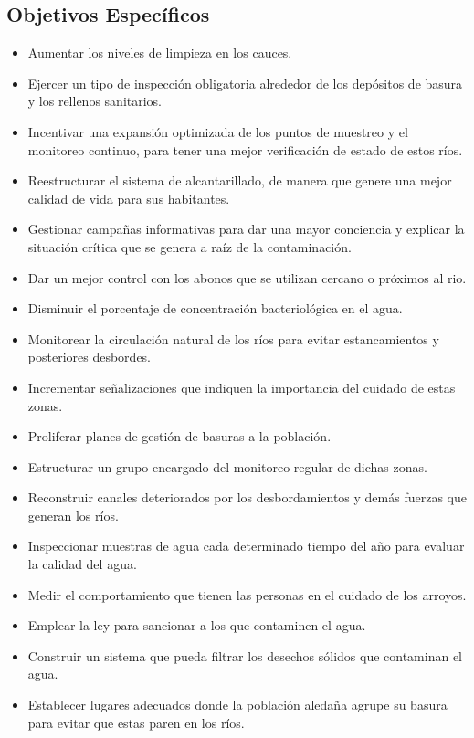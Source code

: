 \subsection{Objetivos Específicos}
\begin{itemize}
	\item Aumentar los niveles de limpieza en los cauces.
	\item Ejercer un tipo de inspección obligatoria alrededor de los depósitos de basura y los rellenos sanitarios.
	\item Incentivar una expansión optimizada de los puntos de muestreo y el monitoreo continuo, para tener una mejor verificación de estado de estos ríos.
	\item Reestructurar el sistema de alcantarillado, de manera que genere una mejor calidad de vida para sus habitantes.
	\item Gestionar campañas informativas para dar una mayor conciencia y explicar la situación crítica que se genera a raíz de la contaminación.
	\item Dar un mejor control con los abonos que se utilizan cercano o próximos al rio.
	\item Disminuir el porcentaje de concentración bacteriológica en el agua.
	\item Monitorear la circulación natural de los ríos para evitar estancamientos y posteriores desbordes.
	\item Incrementar señalizaciones que indiquen la importancia del cuidado de estas zonas.
	\item Proliferar planes de gestión de basuras a la población.
	\item Estructurar un grupo encargado del monitoreo regular de dichas zonas.
	\item Reconstruir canales deteriorados por los desbordamientos y demás fuerzas que generan los ríos.
	\item Inspeccionar muestras de agua cada determinado tiempo del año para evaluar la calidad del agua.
	\item Medir el comportamiento que tienen las personas en el cuidado de los arroyos.
	\item Emplear la ley para sancionar a los que contaminen el agua.
	\item Construir un sistema que pueda filtrar los desechos sólidos que contaminan el agua.
	\item Establecer lugares adecuados donde la población aledaña agrupe su basura para evitar que estas paren en los ríos.
\end{itemize}
